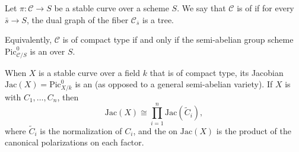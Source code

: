 \begin{definition} \label{definition:stable_curve_of_compact_type_over_a_scheme}
    Let $\pi\colon \mathcal{C} \to S$ be a stable curve over a scheme $S$. We say that $\mathcal{C}$ is of  if for every  $\bar{s} \to S$, the dual graph of the fiber $\mathcal{C}_{\bar{s}}$ is a tree.

    Equivalently, $\mathcal{C}$ is of compact type if and only if the semi-abelian group scheme $\mathrm{Pic}^0_{\mathcal{C}/S}$ is an  over $S$.

    When $X$ is a stable curve over a field $k$ that is of compact type, its Jacobian $\mathrm{Jac}(X) = \mathrm{Pic}^0_{X/k}$ is an  (as opposed to a general semi-abelian variety). If $X$ is  with  $C_1, \dots, C_n$, then
    $$\mathrm{Jac}(X) \cong \prod_{i=1}^n \mathrm{Jac}(\widetilde{C}_i),$$
    where $\widetilde{C}_i$ is the normalization of $C_i$, and the  on $\mathrm{Jac}(X)$ is the product of the canonical polarizations on each factor.
\end{definition}
